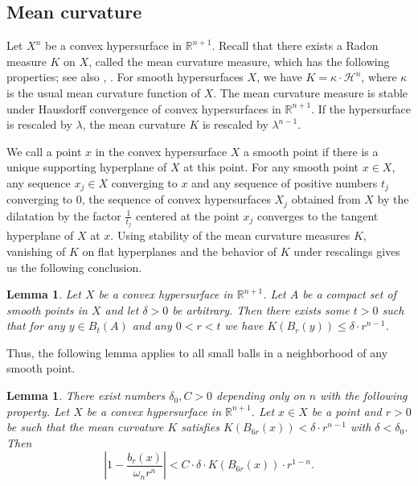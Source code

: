 \documentclass[12pt,leqno,intlimits]{amsart}
\numberwithin{equation}{section}
\newtheorem{lem}[thm]{Lemma}
\theoremstyle{definition}
\theoremstyle{remark}
\newcommand{\R}{\mathbb{R}}
\begin{document}
\subsection{Mean curvature}
Let $X^n$ be a convex hypersurface in $\R ^{n+1}$. Recall that there exists a Radon measure $K$ on $X$, called the mean curvature measure, which has the following properties; see also \cite{Schneider}, \cite{Fedcurvature}.
For smooth hypersurfaces $X$, we have $K=\kappa \cdot \mathcal H^n$, where $\kappa$ is the usual mean curvature function of $X$.
The mean curvature measure is stable under Hausdorff convergence of convex hypersurfaces in $\R^{n+1}$. If the hypersurface is rescaled by $\lambda$, the mean curvature $K$ is rescaled by $\lambda ^{n-1}$.

We call a point $x$ in the convex hypersurface $X$ a smooth point if there is a unique supporting hyperplane of $X$ at this point.
For any smooth point $x\in X$, any sequence $x_j\in X$ converging to $x$ and any sequence of positive numbers $t_j$ converging to $0$, the
sequence of convex hypersurfaces $X_j$ obtained from $X$ by the dilatation by the factor $\frac 1 {t_j}$ centered at the point $x_j$ converges
to the tangent hyperplane of $X$ at $x$. Using stability of the mean curvature measures $K$, vanishing of $K$ on flat hyperplanes and
the behavior of $K$ under rescalings gives us the following conclusion.
\begin{lem} \label{lem:compsm}
Let $X$ be a convex hypersurface in $\R^{n+1}$. Let $A$ be a compact set of smooth points in $X$ and let $\delta >0$ be arbitrary.
Then there exists some $t>0$ such that for any $y\in B_{t} (A)$ and any $0<r<t$ we have $K(B_r(y)) \leq \delta \cdot r^{n-1}$.
\end{lem}
Thus, the following lemma applies to all small balls in a neighborhood of any smooth point.


\begin{lem} \label{lem:mean}
There exist numbers $\delta_0,C>0$ depending only on $n$ with the following property. Let $X$ be a convex hypersurface in $\R^{n+1}$.
Let $x\in X$ be a point and $r>0$ be such that the mean curvature $K$ satisfies $K(B_{6r} (x)) < \delta \cdot r^{n-1}$ with $\delta <\delta _0$.
Then
\begin{equation} \label{eq:lemma}
| 1 - \frac {b_r (x)} { \omega _n r^n}| < C\cdot \delta \cdot K( B_{6r} (x)) \cdot r^{1-n}.
\end{equation}
\end{lem}
\end{document}
